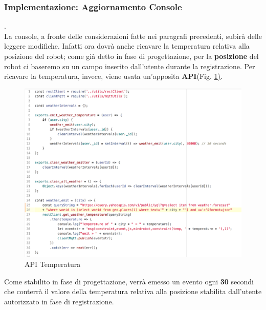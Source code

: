 \documentclass{llncs}
\begin{document}
\subsubsection{Implementazione: Aggiornamento Console} .
\label{ImplementazioneReq2Console}
\vspace*{1ex}
\\
La console, a fronte delle considerazioni fatte nei paragrafi precedenti, subir\`a delle leggere modifiche.
Infatti ora dovr\`a anche ricavare la temperatura relativa alla posizione del robot; come gi\`a detto in fase di progettazione, per la \textbf{posizione} del robot ci baseremo su un campo inserito dall'utente durante la registrazione. Per ricavare la temperatura, invece, viene usata un'apposita \textbf{API}(Fig. \hyperref[fig:MindHandleEvent]{\ref{fig:MindHandleEvent})}.\\
\begin{figure}
    \centering
    \includegraphics[width=1\textwidth]{Immagini/Requisito2/TemperatureAPI.png}
    \caption{API Temperatura}
    \label{fig:MindHandleEvent}
\end{figure}
Come stabilito in fase di progettazione, verr\`a emesso un evento ogni \textbf{30} secondi che conterr\`a il valore della temperatura relativa alla posizione stabilita dall'utente autorizzato in fase di registrazione.\\
\end{document}
